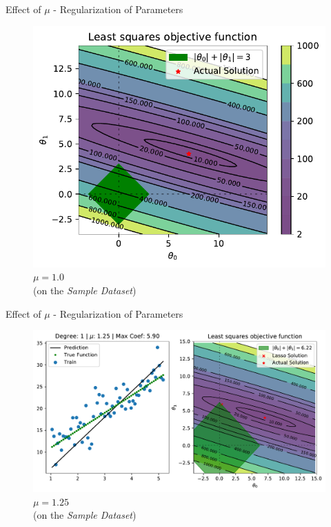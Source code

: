 \documentclass{beamer}
\begin{document}
\begin{frame}{Effect of $\mu$ - Regularization of Parameters}
\vspace{0.4cm}
\begin{figure}

\includegraphics[width=0.9\linewidth]{../assets/lasso/figures/lasso_base_contour.pdf}
\caption{$\mu = 1.0$\\(on the \emph{Sample Dataset})}
\end{figure}
\end{frame}

\begin{frame}{Effect of $\mu$ - Regularization of Parameters}
\vspace{0.4cm}
\begin{figure}\includegraphics[width=0.9\linewidth]{../assets/lasso/figures/lasso_1.25.pdf}\caption{$\mu = 1.25$\\(on the \emph{Sample Dataset})}
\end{figure}
\end{frame}
\end{document}

